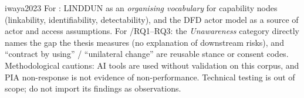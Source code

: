 \begin{papercard}{iwaya2023}
 For : LINDDUN as an \emph{organising vocabulary} for capability nodes (linkability, identifiability, detectability), and the DFD actor model as a source of actor and access assumptions. For /RQ1--RQ3: the \emph{Unawareness} category directly names the gap the thesis measures (no explanation of downstream risks), and ``contract by using'' / ``unilateral change'' are reusable stance or consent codes. Methodological cautions: AI tools are used without validation on this corpus, and PIA non-response is not evidence of non-performance. Technical testing is out of scope; do not import its findings as observations.
\end{papercard}
